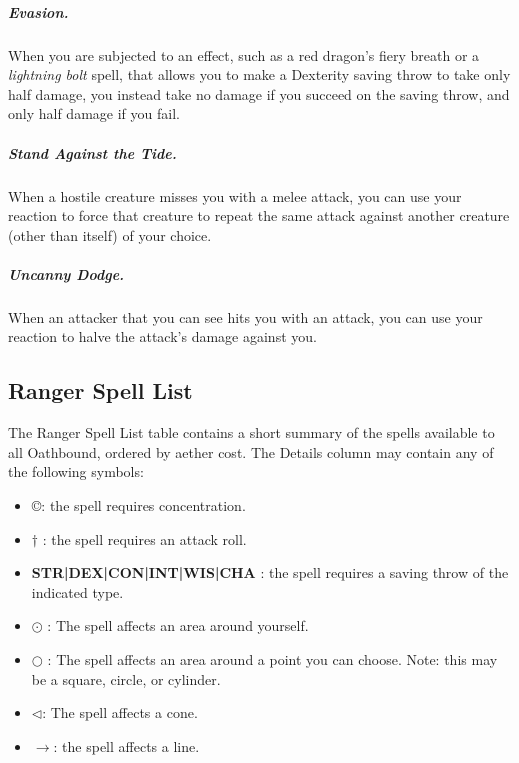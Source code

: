 \subparagraph*{Evasion.} When you are subjected to an effect, such as a red dragon's fiery breath or a \textit{lightning bolt} spell, that allows you to make a Dexterity saving throw to take only half damage, you instead take no damage if you succeed on the saving throw, and only half damage if you fail.

\subparagraph*{Stand Against the Tide.} When a hostile creature misses you with a melee attack, you can use your reaction to force that creature to repeat the same attack against another creature (other than itself) of your choice.

\subparagraph*{Uncanny Dodge.} When an attacker that you can see hits you with an attack, you can use your reaction to halve the attack's damage against you.

\subsection{Ranger Spell List}
The Ranger Spell List table contains a short summary of the spells available to all Oathbound, ordered by aether cost. The Details column may contain any of the following symbols:
\begin{itemize}
	\item \copyright : the spell requires concentration.
	\item $\dagger$ : the spell requires an attack roll.
	\item \textbf{STR|DEX|CON|INT|WIS|CHA} : the spell requires a saving throw of the indicated type.
	\item $\odot$ : The spell affects an area around yourself.
	\item $\bigcirc$ : The spell affects an area around a point you can choose. Note: this may be a square, circle, or cylinder.
	\item $\triangleleft$: The spell affects a cone.
	\item $\rightarrow$: the spell affects a line.
\end{itemize}

